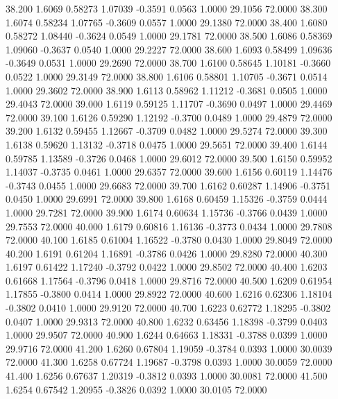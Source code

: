   38.200   1.6069   0.58273   1.07039  -0.3591   0.0563   1.0000  29.1056  72.0000
  38.300   1.6074   0.58234   1.07765  -0.3609   0.0557   1.0000  29.1380  72.0000
  38.400   1.6080   0.58272   1.08440  -0.3624   0.0549   1.0000  29.1781  72.0000
  38.500   1.6086   0.58369   1.09060  -0.3637   0.0540   1.0000  29.2227  72.0000
  38.600   1.6093   0.58499   1.09636  -0.3649   0.0531   1.0000  29.2690  72.0000
  38.700   1.6100   0.58645   1.10181  -0.3660   0.0522   1.0000  29.3149  72.0000
  38.800   1.6106   0.58801   1.10705  -0.3671   0.0514   1.0000  29.3602  72.0000
  38.900   1.6113   0.58962   1.11212  -0.3681   0.0505   1.0000  29.4043  72.0000
  39.000   1.6119   0.59125   1.11707  -0.3690   0.0497   1.0000  29.4469  72.0000
  39.100   1.6126   0.59290   1.12192  -0.3700   0.0489   1.0000  29.4879  72.0000
  39.200   1.6132   0.59455   1.12667  -0.3709   0.0482   1.0000  29.5274  72.0000
  39.300   1.6138   0.59620   1.13132  -0.3718   0.0475   1.0000  29.5651  72.0000
  39.400   1.6144   0.59785   1.13589  -0.3726   0.0468   1.0000  29.6012  72.0000
  39.500   1.6150   0.59952   1.14037  -0.3735   0.0461   1.0000  29.6357  72.0000
  39.600   1.6156   0.60119   1.14476  -0.3743   0.0455   1.0000  29.6683  72.0000
  39.700   1.6162   0.60287   1.14906  -0.3751   0.0450   1.0000  29.6991  72.0000
  39.800   1.6168   0.60459   1.15326  -0.3759   0.0444   1.0000  29.7281  72.0000
  39.900   1.6174   0.60634   1.15736  -0.3766   0.0439   1.0000  29.7553  72.0000
  40.000   1.6179   0.60816   1.16136  -0.3773   0.0434   1.0000  29.7808  72.0000
  40.100   1.6185   0.61004   1.16522  -0.3780   0.0430   1.0000  29.8049  72.0000
  40.200   1.6191   0.61204   1.16891  -0.3786   0.0426   1.0000  29.8280  72.0000
  40.300   1.6197   0.61422   1.17240  -0.3792   0.0422   1.0000  29.8502  72.0000
  40.400   1.6203   0.61668   1.17564  -0.3796   0.0418   1.0000  29.8716  72.0000
  40.500   1.6209   0.61954   1.17855  -0.3800   0.0414   1.0000  29.8922  72.0000
  40.600   1.6216   0.62306   1.18104  -0.3802   0.0410   1.0000  29.9120  72.0000
  40.700   1.6223   0.62772   1.18295  -0.3802   0.0407   1.0000  29.9313  72.0000
  40.800   1.6232   0.63456   1.18398  -0.3799   0.0403   1.0000  29.9507  72.0000
  40.900   1.6244   0.64663   1.18331  -0.3788   0.0399   1.0000  29.9716  72.0000
  41.200   1.6260   0.67804   1.19059  -0.3784   0.0393   1.0000  30.0039  72.0000
  41.300   1.6258   0.67724   1.19687  -0.3798   0.0393   1.0000  30.0059  72.0000
  41.400   1.6256   0.67637   1.20319  -0.3812   0.0393   1.0000  30.0081  72.0000
  41.500   1.6254   0.67542   1.20955  -0.3826   0.0392   1.0000  30.0105  72.0000
